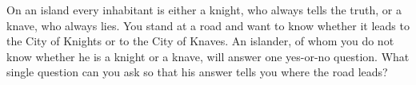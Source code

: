 On an island every inhabitant is either a knight, who always tells the truth, or a knave, who always lies. You stand at a road and want to know whether it leads to the City of Knights or to the City of Knaves. An islander, of whom you do not know whether he is a knight or a knave, will answer one yes-or-no question. What single question can you ask so that his answer tells you where the road leads?
